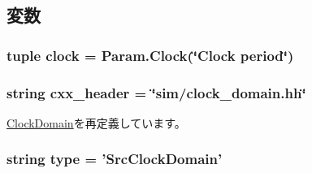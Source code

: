 \subsection{変数}
\hypertarget{classClockDomain_1_1SrcClockDomain_a8824700cf5ea6cdc0f9d75f540668df9}{
\subsubsection[{clock}]{\setlength{\rightskip}{0pt plus 5cm}tuple {\bf clock} = Param.Clock(\char`\"{}Clock period\char`\"{})}}
\label{classClockDomain_1_1SrcClockDomain_a8824700cf5ea6cdc0f9d75f540668df9}
\hypertarget{classClockDomain_1_1SrcClockDomain_a17da7064bc5c518791f0c891eff05fda}{
\subsubsection[{cxx\_\-header}]{\setlength{\rightskip}{0pt plus 5cm}string {\bf cxx\_\-header} = \char`\"{}sim/clock\_\-domain.hh\char`\"{}}}
\label{classClockDomain_1_1SrcClockDomain_a17da7064bc5c518791f0c891eff05fda}


\hyperlink{classClockDomain_1_1ClockDomain_a17da7064bc5c518791f0c891eff05fda}{ClockDomain}を再定義しています。\hypertarget{classClockDomain_1_1SrcClockDomain_acce15679d830831b0bbe8ebc2a60b2ca}{
\subsubsection[{type}]{\setlength{\rightskip}{0pt plus 5cm}string {\bf type} = '{\bf SrcClockDomain}'}}
\label{classClockDomain_1_1SrcClockDomain_acce15679d830831b0bbe8ebc2a60b2ca}


